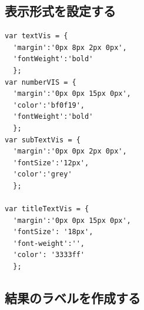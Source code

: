 \documentclass[
]{book}
\begin{document}
\hypertarget{ux8868ux793aux5f62ux5f0fux3092ux8a2dux5b9aux3059ux308b}{%
\subsection{表示形式を設定する}\label{ux8868ux793aux5f62ux5f0fux3092ux8a2dux5b9aux3059ux308b}}

\begin{verbatim}
var textVis = {
  'margin':'0px 8px 2px 0px',
  'fontWeight':'bold'
  };
var numberVIS = {
  'margin':'0px 0px 15px 0px', 
  'color':'bf0f19',
  'fontWeight':'bold'
  };
var subTextVis = {
  'margin':'0px 0px 2px 0px',
  'fontSize':'12px',
  'color':'grey'
  };

var titleTextVis = {
  'margin':'0px 0px 15px 0px',
  'fontSize': '18px', 
  'font-weight':'', 
  'color': '3333ff'
  };
\end{verbatim}

\hypertarget{ux7d50ux679cux306eux30e9ux30d9ux30ebux3092ux4f5cux6210ux3059ux308b}{%
\subsection{結果のラベルを作成する}\label{ux7d50ux679cux306eux30e9ux30d9ux30ebux3092ux4f5cux6210ux3059ux308b}}
\end{document}

